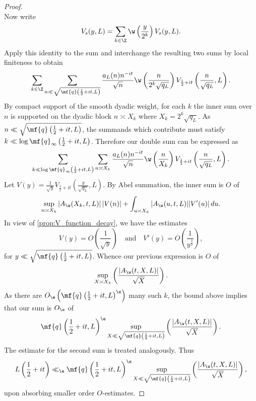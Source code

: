 \documentclass[12pt]{article}
\begin{document}
\begin{proof}
\[        \]
        Now write 
        \[
          V_{s}(y,L) = \sum_{k \in \Z}\w\left(\frac{y}{2^{k}}\right)V_{s}(y,L).
        \]
        Apply this identity to the sum and interchange the resulting two sums by local finiteness to obtain
        \[
          \sum_{k \in \Z}\sum_{n \ll \sqrt{\mf{q}\left(\frac{1}{2}+it,L\right)}}\frac{a_{L}(n)n^{-it}}{\sqrt{n}}\w\left(\frac{n}{2^{k}\sqrt{q_{L}}}\right)V_{\frac{1}{2}+it}\left(\frac{n}{\sqrt{q_{L}}},L\right).
        \]
        By compact support of the smooth dyadic weight, for each \(k\) the inner sum over \(n\) is supported on the dyadic block \(n \asymp X_{k}\) where \(X_{k} = 2^{k}\sqrt{q_{L}}\). As \(n \ll \sqrt{\mf{q}\left(\frac{1}{2}+it,L\right)}\), the summands which contribute must satisfy \(k \ll \log\mf{q}_{\infty}\left(\frac{1}{2}+it,L\right)\). Therefore our double sum can be expressed as
        \[
          \sum_{k \ll \log\mf{q}_{\infty}\left(\frac{1}{2}+it,L\right)}\sum_{n \asymp X_{k}}\frac{a_{L}(n)n^{-it}}{\sqrt{n}}\w\left(\frac{n}{X_{k}}\right)V_{\frac{1}{2}+it}\left(\frac{n}{\sqrt{q_{L}}},L\right).
        \]
        Let \(V(y) = \frac{1}{\sqrt{y}}V_{\frac{1}{2}+it}\left(\frac{y}{\sqrt{q_{L}}},L\right)\). By Abel summation, the inner sum is \(O\) of
        \[
          \sup_{n \asymp X_{k}}|A_{\w}(X_{k},t,L)|\left|V(n)\right|+\int_{u \asymp X_{k}}|A_{\w}(u,t,L)||V'(u)|\,du.
        \]
        In view of \cref{prop:V_function_decay}, we have the estimates
        \[
          V(y) = O\left(\frac{1}{\sqrt{y}}\right) \quad \text{and} \quad V'(y) = O\left(\frac{1}{y^{\frac{3}{2}}}\right),
        \]
        for \(y \ll \sqrt{\mf{q}\left(\frac{1}{2}+it,L\right)}\). Whence our previous expression is \(O\) of
        \[
          \sup_{X \asymp X_{k}}\left(\frac{|A_{\w}(t,X,L)|}{\sqrt{X}}\right).
        \]
        As there are \(O_{\e}\left(\mf{q}\left(\frac{1}{2}+it,L\right)^{\e}\right)\) many such \(k\), the bound above implies that our sum is \(O_{\e}\) of
        \[
          \mf{q}\left(\frac{1}{2}+it,L\right)^{\e}\sup_{X \ll \sqrt{\mf{q}\left(\frac{1}{2}+it,L\right)}}\left(\frac{|A_{\w}(t,X,L)|}{\sqrt{X}}\right).
        \]
        The estimate for the second sum is treated analogously. Thus
        \[
          L\left(\frac{1}{2}+it\right) \ll_{\e} \mf{q}\left(\frac{1}{2}+it,L\right)^{\e}\sup_{X \ll \sqrt{\mf{q}\left(\frac{1}{2}+it,L\right)}}\left(\frac{|A_{\w}(t,X,L)|}{\sqrt{X}}\right),
        \]
        upon absorbing smaller order \(O\)-estimates.
      \end{proof}
\end{document}
